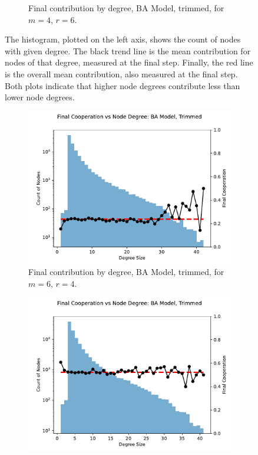 \begin{figure}[!h]
\begin{subfigure}[b]{0.45\textwidth}
    \caption{Final contribution by degree, BA Model, trimmed, for $m=4$, $r=6$. }
    \label{ID_by_degree_m_4_phi_6}
  \end{subfigure}
  \caption{The histogram, plotted on the left axis, shows the count of nodes with given degree. The black trend line is the mean contribution for nodes of that degree, measured at the final step. Finally, the red line is the overall mean contribution, also measured at the final step. Both plots indicate that higher node degrees contribute less than lower node degrees.} \label{ID_by_degree_m_4}
\end{figure} 
\FloatBarrier


\FloatBarrier 
\begin{figure}[!h]
  \begin{subfigure}[b]{0.45\textwidth}
    \includegraphics[width=1.1\textwidth]{images/Rep_BA_node_groups_m_6_phi_4_trimmed.pdf}
    \caption{Final contribution by degree, BA Model, trimmed, for $m=6$, $r=4$.   }
    \label{ID_by_degree_m_6_phi_4}
  \end{subfigure}
  \hfill
  \begin{subfigure}[b]{0.45\textwidth}
    \includegraphics[width=1.1\textwidth]{images/ID_BA_node_groups_m_6_phi_6_trimmed.pdf}

\end{subfigure}
\end{figure}
